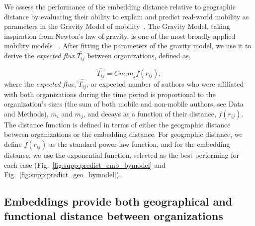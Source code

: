 \documentclass[12pt]{article} %
\begin{document}
We assess the performance of the embedding distance relative to geographic distance by evaluating their ability to explain and predict real-world mobility as parameters in the Gravity Model of mobility~\autocite{zipf1946gravity, barbosa2018human}.
The Gravity Model, taking inspiration from Newton's law of gravity, is one of the most broadly applied mobility models~\autocite{curiel2018citygravity, lewer2008immigrationgravity, jung2008highwaygravity, hong2016busgravity, truscott2012epidemicgravity, xia2005measlesgravity} . After fitting the parameters of the gravity model, we use it to derive the \textit{expected flux} $\hat{T_{ij}}$ between organizations, defined as,


\begin{equation}
	\label{eq:gravity_basic}
	\hat{T_{ij}} = Cm_{i}m_{j}f(r_{ij}),
\end{equation}
where the \textit{expected flux}, $\hat{T_{ij}}$, or expected number of authors who were affiliated with both organizations during the time period is proportional to the organization's sizes (the sum of both mobile and non-mobile authors, see Data and Methods), $m_{i}$ and $m_{j}$, and decays as a function of their distance, $f(r_{ij})$.
The distance function is defined in terms of either the geographic distance between organizations or the embedding distance. 
For geographic distance, we define $f(r_{ij})$ as the standard power-law function, and for the embedding distance, we use the exponential function, selected as the best performing for each case (Fig.~\ref{fig:supp:predict_emb_bymodel} and Fig.~\ref{fig:supp:predict_geo_bymodel}).


%
%
%
\subsection*{Embeddings provide both geographical and functional distance between organizations}
\end{document}
